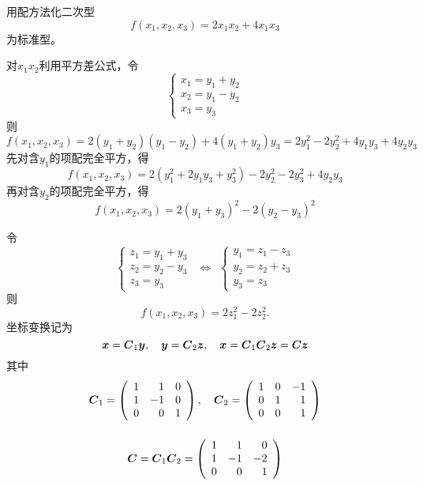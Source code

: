 \begin{frame}
  
    \begin{li}
      用配方法化二次型
      $$
      f(x_1,x_2,x_3)=2x_1x_2+4x_1x_3
      $$
      为标准型。
    \end{li}
    \pause
    \begin{jie}
    对$x_1x_2$利用平方差公式，令
    $$
    \left\{
    \begin{array}{l}
      x_1=y_1+y_2\\
      x_2=y_1-y_2\\
      x_3=y_3
    \end{array}
    \right.
    $$
    则
    $$
    f(x_1,x_2,x_3)=2(y_1+y_2)(y_1-y_2)+4(y_1+y_2)y_3=2y_1^2-2y_2^2+4y_1y_3+4y_2y_3
    $$
    \pause
    先对含$y_1$的项配完全平方，得
    $$
    f(x_1,x_2,x_3)=2(y_1^2+2y_1y_3+y_3^2)-2y_2^2-2y_3^2+4y_2y_3
    $$
    再对含$y_2$的项配完全平方，得
    $$
    f(x_1,x_2,x_3)=2(y_1+y_3)^2-2(y_2-y_3)^2
    $$
  \end{jie}
\end{frame}

\begin{frame}
  
    令
    $$
    \left\{
    \begin{array}{l}
      z_1=y_1+y_3\\
      z_2=y_2-y_3\\
      z_3=y_3
    \end{array}
    \right. ~~\Longleftrightarrow~~
    \left\{
    \begin{array}{l}
      y_1=z_1-z_3\\
      y_2=z_2+z_3\\
      y_3=z_3
    \end{array}
    \right.
    $$
    则
    $$
    f(x_1,x_2,x_3)=2z_1^2-2z_2^2.
    $$\pause
    坐标变换记为
    $$
    {\boldsymbol{x}}=\boldsymbol{C}_1{\boldsymbol{y}}, \quad  {\boldsymbol{y}}=\boldsymbol{C}_2{\boldsymbol{z}}, \quad {\boldsymbol{x}}=\boldsymbol{C}_1\boldsymbol{C}_2{\boldsymbol{z}}=\boldsymbol{C}{\boldsymbol{z}}
    $$
    其中
    $$
    \begin{array}{c}
      \boldsymbol{C}_1=\left(
      \begin{array}{rrr}
        1&1&0\\
        1&-1&0\\
        0&0&1
      \end{array}
      \right),
      \quad\boldsymbol{C}_2=\left(
      \begin{array}{rrr}
        1&0&-1\\
        0&1&1\\
        0&0&1
      \end{array}
      \right)
      \\[0.4in]
      \boldsymbol{C}=\boldsymbol{C}_1\boldsymbol{C}_2=\left(
      \begin{array}{rrr}
        1&1&0\\
        1&-1&-2\\
        0&0&1
      \end{array}
      \right)      
    \end{array}
    $$
  
\end{frame}

